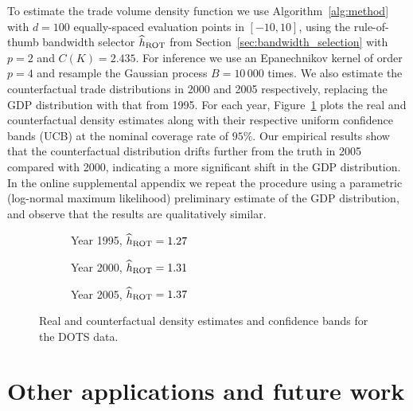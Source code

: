 To estimate the trade volume density function
we use Algorithm~\ref{alg:method}
with $d=100$ equally-spaced evaluation points in $[-10,10]$,
using the rule-of-thumb bandwidth selector $\widehat h_{\operatorname{ROT}}$
from Section~\ref{sec:bandwidth_selection} with
$p=2$ and $C(K) = 2.435$.
For inference we use an
Epanechnikov kernel of order $p=4$ and
resample the Gaussian process
$B = 10\,000$ times.
We also estimate the counterfactual trade distributions
in 2000 and 2005 respectively,
replacing the GDP distribution with that from 1995.
For each year, Figure~\ref{fig:trade}
plots the real and counterfactual density estimates
along with their respective uniform confidence bands (UCB)
at the nominal coverage rate of $95\%$.
Our empirical results show that
the counterfactual distribution drifts further from the truth
in 2005 compared with 2000, indicating a more significant shift
in the GDP distribution.
In the online supplemental appendix we repeat the procedure
using a parametric (log-normal maximum likelihood) preliminary estimate
of the GDP distribution, and observe that the results
are qualitatively similar.

\begin{figure}[ht]
  \centering
  \begin{subfigure}{0.32\textwidth}
    \centering
    \caption{Year 1995, $\widehat h_{\operatorname{ROT}} = 1.27$}
  \end{subfigure}
  \begin{subfigure}{0.32\textwidth}
    \centering
    \caption{Year 2000, $\widehat h_{\operatorname{ROT}} = 1.31$}
  \end{subfigure}
  \begin{subfigure}{0.32\textwidth}
    \centering
    \caption{Year 2005, $\widehat h_{\operatorname{ROT}} = 1.37$}
  \end{subfigure}
  \caption{Real and counterfactual density estimates
    and confidence bands for the DOTS data.}
  \label{fig:trade}
\end{figure}

\section{Other applications and future work}
\label{sec:future}

